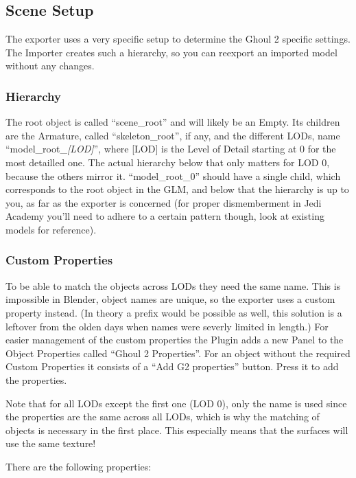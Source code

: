 \documentclass[a4paper,10pt]{article}
\begin{document}
 \subsection{Scene Setup}
 
 The exporter uses a very specific setup to determine the Ghoul 2 specific settings. The Importer creates
 such a hierarchy, so you can reexport an imported model without any changes.
 
 \subsubsection{Hierarchy}
 
 The root object is called ``scene\_root'' and will likely be an Empty. Its children are the Armature, called
 ``skeleton\_root'', if any, and the different LODs, name ``model\_root\_\emph{[LOD]}'', where [LOD] is the Level
 of Detail starting at 0 for the most detailled one. The actual hierarchy below that only matters for LOD 0,
 because the others mirror it. ``model\_root\_0'' should have a single child, which corresponds to the root
 object in the GLM, and below that the hierarchy is up to you, as far as the exporter is concerned (for proper
 dismemberment in Jedi Academy you'll need to adhere to a certain pattern though, look at existing  models
 for reference).
 
 \subsubsection{Custom Properties}
 
 To be able to match the objects across LODs they need the same name. This is impossible in Blender, object
 names are unique, so the exporter uses a custom property instead. (In theory a prefix would be possible as
 well, this solution is a leftover from the olden days when names were severly limited in length.) For easier
 management of the custom properties the Plugin adds a new Panel to the Object Properties called ``Ghoul 2
 Properties''. For an object without the required Custom Properties it consists of a ``Add G2 properties'' button.
 Press it to add the properties.
 
 Note that for all LODs except the first one (LOD 0), only the name is used since the properties are
 the same across all LODs, which is why the matching of objects is necessary in the first place. This
 especially means that the surfaces will use the same texture!
 
 There are the following properties:
 
\end{document}
